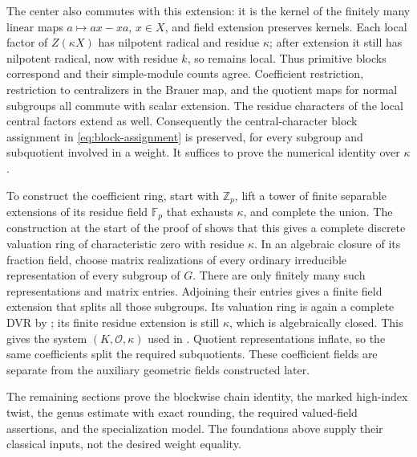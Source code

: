 The center also commutes with this extension: it is the kernel of the
finitely many linear maps $a\mapsto ax-xa$, $x\in X$, and field
extension preserves kernels. Each local factor of $Z(\kappa X)$ has
nilpotent radical and residue $\kappa$; after extension it still has
nilpotent radical, now with residue $k$, so remains local. Thus
primitive blocks correspond and their simple-module counts agree.
Coefficient restriction, restriction to centralizers in the Brauer
map, and the quotient maps for normal subgroups all commute with
scalar extension. The residue characters of the local central factors
extend as well. Consequently the central-character block assignment
in \eqref{eq:block-assignment} is preserved, for every subgroup and
subquotient involved in a weight. It suffices to prove the numerical
identity over $\kappa$.

To construct the coefficient ring, start with $\mathbb Z_p$, lift a
tower of finite separable extensions of its residue field $\mathbb F_p$
that exhausts $\kappa$, and complete the union. The construction at the
start of the proof of  shows that this gives a
complete discrete valuation ring of characteristic zero with residue
$\kappa$.
In an algebraic closure of its fraction field, choose matrix
realizations of every ordinary irreducible representation of every
subgroup of $G$. There are only finitely many such representations and
matrix entries. Adjoining their entries gives a finite field extension
that splits all those subgroups. Its valuation ring is again a complete
DVR by ; its finite residue extension is
still $\kappa$, which is algebraically closed. This gives the system
$(K,\mathcal O,\kappa)$ used in . Quotient
representations inflate, so the same coefficients split the required
subquotients. These coefficient fields are separate from the auxiliary
geometric fields constructed later.

The remaining sections prove the blockwise chain identity, the marked
high-index twist, the genus estimate with exact rounding, the required
valued-field assertions, and the specialization model. The foundations
above supply their classical inputs, not the desired weight equality.
